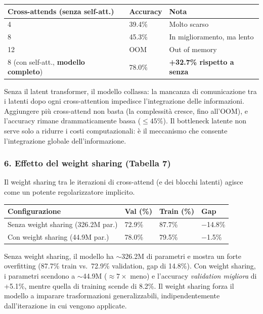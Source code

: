 \documentclass[
  11pt,
]{article}
\begin{document}
{\small
\begin{longtable}{@{}p{5cm} p{2.8cm} p{4cm}@{}}
\toprule
\textbf{Cross-attends (senza self-att.)} & \textbf{Accuracy} & \textbf{Nota} \\
\midrule
\endhead
4  & 39.4\% & Molto scarso \\[2pt]
8  & 45.3\% & In miglioramento, ma lento \\[2pt]
12 & OOM    & Out of memory \\[2pt]
\midrule
8 (con self-att., \textbf{modello completo}) & 78.0\% & \textbf{+32.7\% rispetto a senza} \\[2pt]
\bottomrule
\end{longtable}
}

\begin{notabox}[title={\textbf{Il latent bottleneck è essenziale}}]
Senza il latent transformer, il modello collassa: la mancanza di comunicazione tra i latenti dopo ogni cross-attention impedisce l'integrazione delle informazioni. Aggiungere più cross-attend non basta (la complessità cresce, fino all'OOM), e l'accuracy rimane drammaticamente bassa ($\le 45\%$). Il bottleneck latente non serve solo a ridurre i costi computazionali: è il meccanismo che consente l'integrazione globale dell'informazione.
\end{notabox}

\subsubsection*{6. Effetto del weight sharing (Tabella 7)}

Il weight sharing tra le iterazioni di cross-attend (e dei blocchi latenti) agisce come un potente regolarizzatore implicito.

{\small
\begin{longtable}{@{}p{5.5cm} p{2.5cm} p{2.5cm} p{2cm}@{}}
\toprule
\textbf{Configurazione} & \textbf{Val (\%)} & \textbf{Train (\%)} & \textbf{Gap} \\
\midrule
\endhead
Senza weight sharing (326.2M par.) & 72.9\% & 87.7\% & $-$14.8\% \\[2pt]
Con weight sharing (44.9M par.)    & 78.0\% & 79.5\% & $-$1.5\% \\[2pt]
\bottomrule
\end{longtable}
}

\begin{notabox}[title={\textbf{Weight sharing come regolarizzatore}}]
Senza weight sharing, il modello ha $\sim$326.2M di parametri e mostra un forte overfitting (87.7\% train vs.\ 72.9\% validation, gap di 14.8\%). Con weight sharing, i parametri scendono a $\sim$44.9M ($\approx 7\times$ meno) e l'accuracy \emph{validation migliora} di +5.1\%, mentre quella di training scende di 8.2\%. Il weight sharing forza il modello a imparare trasformazioni generalizzabili, indipendentemente dall'iterazione in cui vengono applicate.
\end{notabox}
\end{document}
